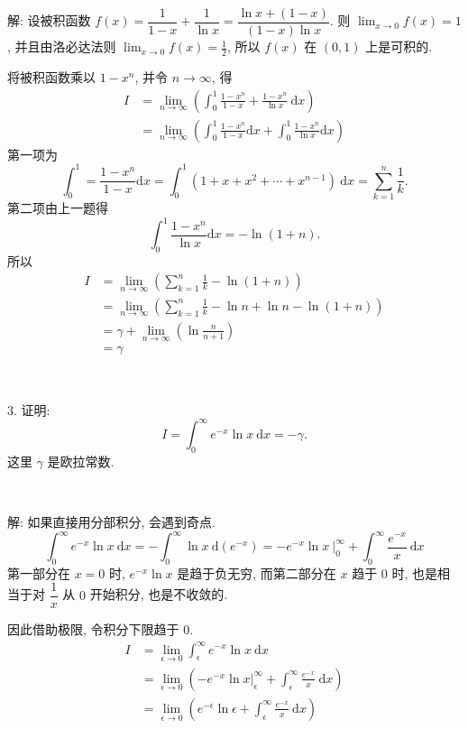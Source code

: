 解: 设被积函数 $f(x) = \dfrac{1}{1-x} + \dfrac{1}{\ln x} = \dfrac{\ln x + (1 - x)}{(1-x)\ln x}$. 则 $\displaystyle \lim_{x\to0}f(x) = 1$, 并且由洛必达法则 $\displaystyle \lim_{x\to0}f(x) = \frac{1}{2}$, 所以 $f(x)$ 在 $(0,1)$ 上是可积的.

将被积函数乘以 $1-x^n$, 并令 $n\to\infty$, 得
\begin{align*}
I &= \lim_{n\to\infty}\left(\int_0^1\frac{1-x^n}{1-x} + \frac{1-x^n}{\ln x}\ \mathrm{d}x \right)\\
&= \lim_{n\to\infty}\left(\int_0^1\frac{1-x^n}{1-x}\mathrm{d}x + \int_0^1\frac{1-x^n}{\ln x}\mathrm{d}x\right) 
\end{align*}
第一项为
\[\int_0^1 = \frac{1-x^n}{1-x}\mathrm{d}x = \int_0^1(1+x+x^2+\cdots+x^{n-1})\ \mathrm{d}x = \sum_{k=1}^{n}\frac{1}{k} .\]
第二项由上一题得 
\[ \int_0^1\frac{1-x^n}{\ln x}\mathrm{d}x = -\ln(1+n) .\]
所以 
\begin{align*}
I &= \lim_{n\to\infty}\left(\sum_{k=1}^{n}\frac{1}{k} - \ln(1+n)\right) \\
&= \lim_{n\to\infty}\left(\sum_{k=1}^{n}\frac{1}{k} - \ln n + \ln n - \ln(1+n)\right) \\
&= \gamma + \lim_{n\to\infty}(\ln\frac{n}{n+1})\\
&= \gamma
\end{align*}

~

3. 证明:
\[ I = \int_0^\infty e^{-x}\ln x\ \mathrm{d}x = -\gamma. \]
这里 $\gamma$ 是欧拉常数.

~

解: 如果直接用分部积分, 会遇到奇点. 
\[
\int_0^\infty e^{-x}\ln x\ \mathrm{d}x = -\int_0^\infty\ln x\ \mathrm{d}(e^{-x}) 
= -e^{-x}\ln x\ \bigg|_{0}^{\infty} + \int_0^\infty \frac{e^{-x}}{x}\ \mathrm{d}x 
\]
第一部分在 $x=0$ 时, $e^{-x}\ln x$ 是趋于负无穷, 而第二部分在 $x$ 趋于 $0$ 时, 也是相当于对 $\dfrac{1}{x}$ 从 $0$ 开始积分, 也是不收敛的.

因此借助极限, 令积分下限趋于 $0$. 
\begin{align*} 
I &= \lim_{\epsilon\to 0}\int_\epsilon^\infty{e^{-x}\ln x}\ \mathrm{d}x \\
&= \lim_{\epsilon\to 0}\left(-e^{-x}\ln x\bigg|_{\epsilon}^{\infty} + \int_\epsilon^\infty \frac{e^{-x}}{x}\ \mathrm{d}x\right) \\
&= \lim_{\epsilon\to 0}\left(e^{-\epsilon}\ln\epsilon + \int_\epsilon^\infty \frac{e^{-x}}{x}\ \mathrm{d}x\right)
\end{align*}

